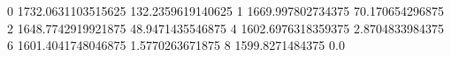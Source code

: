 0 1732.0631103515625 132.2359619140625
1 1669.997802734375 70.170654296875
2 1648.7742919921875 48.9471435546875
4 1602.6976318359375 2.8704833984375
6 1601.4041748046875 1.5770263671875
8 1599.8271484375 0.0
